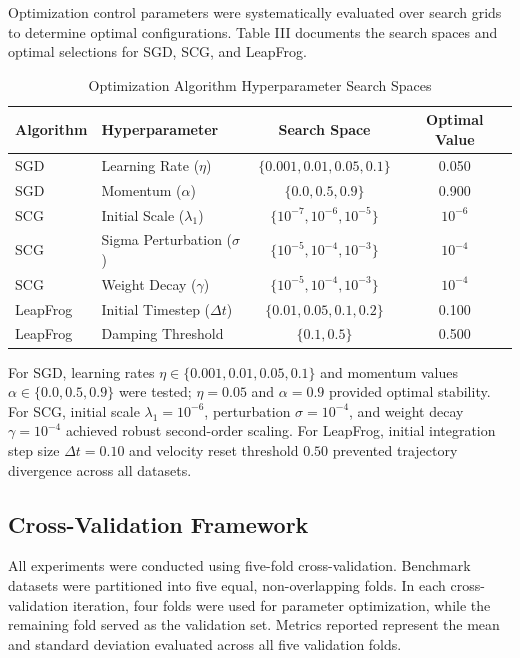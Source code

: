 \documentclass[10pt, conference]{IEEEtran}
\begin{document}
Optimization control parameters were systematically evaluated over search grids to determine optimal configurations. Table III documents the search spaces and optimal selections for SGD, SCG, and LeapFrog.

\begin{table}[t]
\caption{Optimization Algorithm Hyperparameter Search Spaces}
\label{tab:hyperparams}
\centering
\scriptsize
\setlength{\tabcolsep}{2.5pt}
\begin{tabular}{llcc}
\toprule
Algorithm & Hyperparameter & Search Space & Optimal Value \\
\midrule
SGD & Learning Rate ($\eta$) & $\{0.001, 0.01, 0.05, 0.1\}$ & 0.050 \\
SGD & Momentum ($\alpha$) & $\{0.0, 0.5, 0.9\}$ & 0.900 \\
SCG & Initial Scale ($\lambda_1$) & $\{10^{-7}, 10^{-6}, 10^{-5}\}$ & $10^{-6}$ \\
SCG & Sigma Perturbation ($\sigma$) & $\{10^{-5}, 10^{-4}, 10^{-3}\}$ & $10^{-4}$ \\
SCG & Weight Decay ($\gamma$) & $\{10^{-5}, 10^{-4}, 10^{-3}\}$ & $10^{-4}$ \\
LeapFrog & Initial Timestep ($\Delta t$) & $\{0.01, 0.05, 0.1, 0.2\}$ & 0.100 \\
LeapFrog & Damping Threshold & $\{0.1, 0.5\}$ & 0.500 \\
\bottomrule
\end{tabular}
\end{table}

For SGD, learning rates $\eta \in \{0.001, 0.01, 0.05, 0.1\}$ and momentum values $\alpha \in \{0.0, 0.5, 0.9\}$ were tested; $\eta = 0.05$ and $\alpha = 0.9$ provided optimal stability. For SCG, initial scale $\lambda_1 = 10^{-6}$, perturbation $\sigma = 10^{-4}$, and weight decay $\gamma = 10^{-4}$ achieved robust second-order scaling. For LeapFrog, initial integration step size $\Delta t = 0.10$ and velocity reset threshold $0.50$ prevented trajectory divergence across all datasets.

\subsection{Cross-Validation Framework}

All experiments were conducted using five-fold cross-validation. Benchmark datasets were partitioned into five equal, non-overlapping folds. In each cross-validation iteration, four folds were used for parameter optimization, while the remaining fold served as the validation set. Metrics reported represent the mean and standard deviation evaluated across all five validation folds.
\end{document}
